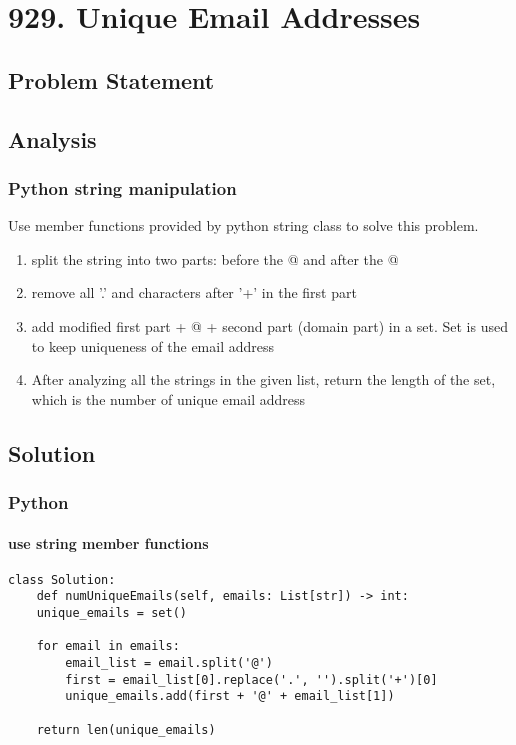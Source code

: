 \documentclass[12pt]{article}
\begin{document}
\section{929. Unique Email Addresses}
\label{sec:orgcac75e0}
\subsection{Problem Statement}
\label{sec:orgbbf3495}
\subsection{Analysis}
\label{sec:org5543300}
\subsubsection{Python string manipulation}
\label{sec:org0043483}
Use member functions provided by python string class to solve this problem.
\begin{enumerate}
\item split the string into two parts: before the @ and after the @
\item remove all '.'  and characters after '+' in the first part
\item add modified first part + @ + second part (domain part) in a set. Set is used to keep uniqueness of the email address
\item After analyzing all the strings in the given list, return the length of the set, which is the number of unique email address
\end{enumerate}
\subsection{Solution}
\label{sec:orge94d004}
\subsubsection{Python}
\label{sec:orgb7445d8}
\paragraph{use string member functions}
\label{sec:orgcb77e62}
\begin{verbatim}
class Solution:
    def numUniqueEmails(self, emails: List[str]) -> int:
	unique_emails = set()

	for email in emails:
	    email_list = email.split('@')
	    first = email_list[0].replace('.', '').split('+')[0]
	    unique_emails.add(first + '@' + email_list[1])

	return len(unique_emails)
\end{verbatim}
\end{document}

